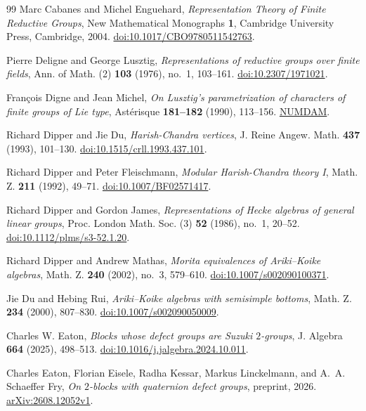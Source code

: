 \begin{thebibliography}{99}
Marc Cabanes and Michel Enguehard,
\emph{Representation Theory of Finite Reductive Groups},
New Mathematical Monographs \textbf{1},
Cambridge University Press, Cambridge, 2004.
\href{https://doi.org/10.1017/CBO9780511542763}{doi:10.1017/CBO9780511542763}.

Pierre Deligne and George Lusztig,
\emph{Representations of reductive groups over finite fields},
Ann. of Math. (2) \textbf{103} (1976), no.~1, 103--161.
\href{https://doi.org/10.2307/1971021}{doi:10.2307/1971021}.

Fran\c{c}ois Digne and Jean Michel,
\emph{On Lusztig's parametrization of characters of finite groups of Lie type},
Ast\'erisque \textbf{181--182} (1990), 113--156.
\href{https://www.numdam.org/item/AST_1990__181-182__113_0/}{NUMDAM}.

Richard Dipper and Jie Du,
\emph{Harish-Chandra vertices},
J. Reine Angew. Math. \textbf{437} (1993), 101--130.
\href{https://doi.org/10.1515/crll.1993.437.101}{doi:10.1515/crll.1993.437.101}.

Richard Dipper and Peter Fleischmann,
\emph{Modular Harish-Chandra theory I},
Math. Z. \textbf{211} (1992), 49--71.
\href{https://doi.org/10.1007/BF02571417}{doi:10.1007/BF02571417}.

Richard Dipper and Gordon James,
\emph{Representations of Hecke algebras of general linear groups},
Proc. London Math. Soc. (3) \textbf{52} (1986), no.~1, 20--52.
\href{https://doi.org/10.1112/plms/s3-52.1.20}{doi:10.1112/plms/s3-52.1.20}.

Richard Dipper and Andrew Mathas,
\emph{Morita equivalences of Ariki--Koike algebras},
Math. Z. \textbf{240} (2002), no.~3, 579--610.
\href{https://doi.org/10.1007/s002090100371}{doi:10.1007/s002090100371}.

Jie Du and Hebing Rui,
\emph{Ariki--Koike algebras with semisimple bottoms},
Math. Z. \textbf{234} (2000), 807--830.
\href{https://doi.org/10.1007/s002090050009}{doi:10.1007/s002090050009}.

Charles W. Eaton,
\emph{Blocks whose defect groups are Suzuki \(2\)-groups},
J. Algebra \textbf{664} (2025), 498--513.
\href{https://doi.org/10.1016/j.jalgebra.2024.10.011}{doi:10.1016/j.jalgebra.2024.10.011}.

Charles Eaton, Florian Eisele, Radha Kessar, Markus Linckelmann,
and A.~A. Schaeffer Fry,
\emph{On \(2\)-blocks with quaternion defect groups},
preprint, 2026.
\href{https://arxiv.org/abs/2608.12052v1}{arXiv:2608.12052v1}.


\end{thebibliography}
